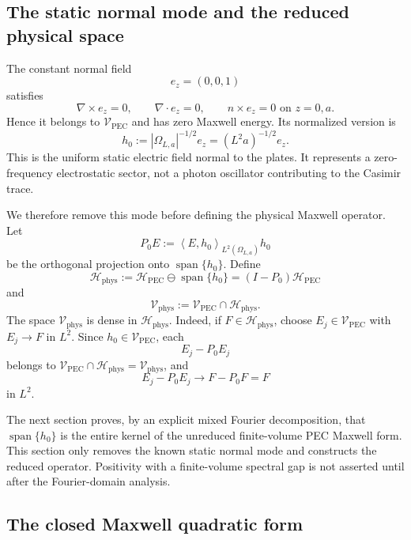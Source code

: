 \documentclass[11pt]{article}
\providecommand{\abs}[1]{\left\lvert #1\right\rvert}
\providecommand{\inner}[2]{\left\langle #1,#2\right\rangle}
\providecommand{\OmegaLa}{\Omega_{L,a}}
\providecommand{\Hphys}{\mathcal H_{\mathrm{phys}}}
\providecommand{\HPEC}{\mathcal H_{\mathrm{PEC}}}
\providecommand{\VPEC}{\mathcal V_{\mathrm{PEC}}}
\providecommand{\Vphys}{\mathcal V_{\mathrm{phys}}}
\providecommand{\hzero}{h_0}
\providecommand{\Pzero}{P_0}
\numberwithin{equation}{section}
\begin{document}
\subsection{The static normal mode and the reduced physical space}
\label{subsec:static-mode-reduction}

The constant normal field
\[
    e_z=(0,0,1)
\]
satisfies
\[
    \nabla\times e_z=0,
    \qquad
    \nabla\cdot e_z=0,
    \qquad
    n\times e_z=0\text{ on }z=0,a .
\]
Hence it belongs to \(\VPEC\) and has zero Maxwell energy.  Its normalized version is
\begin{equation}
\label{eq:hzero-def}
    \hzero:=\abs{\OmegaLa}^{-1/2}e_z=(L^2a)^{-1/2}e_z .
\end{equation}
This is the uniform static electric field normal to the plates.  It represents a zero-frequency electrostatic sector, not a photon oscillator contributing to the Casimir trace.

We therefore remove this mode before defining the physical Maxwell operator.  Let
\begin{equation}
\label{eq:Pzero-def}
    \Pzero E:=\inner{E}{\hzero}_{L^2(\OmegaLa)}\hzero
\end{equation}
be the orthogonal projection onto \(\operatorname{span}\{\hzero\}\).  Define
\begin{equation}
\label{eq:Hphys-def}
    \Hphys:=\HPEC\ominus\operatorname{span}\{\hzero\}
    = (I-\Pzero)\HPEC
\end{equation}
and
\begin{equation}
\label{eq:Vphys-def}
    \Vphys:=\VPEC\cap\Hphys .
\end{equation}
The space \(\Vphys\) is dense in \(\Hphys\).  Indeed, if \(F\in\Hphys\), choose \(E_j\in\VPEC\) with \(E_j\to F\) in \(L^2\).  Since \(\hzero\in\VPEC\), each
\[
    E_j-\Pzero E_j
\]
belongs to \(\VPEC\cap\Hphys=\Vphys\), and
\[
    E_j-\Pzero E_j\longrightarrow F-\Pzero F=F
\]
in \(L^2\).

The next section proves, by an explicit mixed Fourier decomposition, that \(\operatorname{span}\{\hzero\}\) is the entire kernel of the unreduced finite-volume PEC Maxwell form.  This section only removes the known static normal mode and constructs the reduced operator.  Positivity with a finite-volume spectral gap is not asserted until after the Fourier-domain analysis.

\subsection{The closed Maxwell quadratic form}
\label{subsec:maxwell-form}
\end{document}
